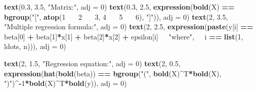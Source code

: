 \documentclass[
  11pt,
]{krantz}
\newenvironment{Shaded}{\begin{snugshade}}{\end{snugshade}}
\newcommand{\DataTypeTok}[1]{\textcolor[rgb]{0.27,0.27,0.27}{#1}}
\newcommand{\DecValTok}[1]{\textcolor[rgb]{0.06,0.06,0.06}{#1}}
\newcommand{\ErrorTok}[1]{\textcolor[rgb]{0.14,0.14,0.14}{\textbf{#1}}}
\newcommand{\FloatTok}[1]{\textcolor[rgb]{0.06,0.06,0.06}{#1}}
\newcommand{\KeywordTok}[1]{\textcolor[rgb]{0.27,0.27,0.27}{\textbf{#1}}}
\newcommand{\NormalTok}[1]{#1}
\newcommand{\OperatorTok}[1]{\textcolor[rgb]{0.43,0.43,0.43}{\textbf{#1}}}
\newcommand{\StringTok}[1]{\textcolor[rgb]{0.5,0.5,0.5}{#1}}
\begin{document}
\begin{tiny}
\begin{Shaded}
\begin{Highlighting}[]
\KeywordTok{text}\NormalTok{(}\FloatTok{0.3}\NormalTok{, }\FloatTok{3.5}\NormalTok{, }\StringTok{"Matrix:"}\NormalTok{, }\DataTypeTok{adj =} \DecValTok{0}\NormalTok{)}
\KeywordTok{text}\NormalTok{(}\FloatTok{0.3}\NormalTok{, }\FloatTok{2.5}\NormalTok{,}
     \KeywordTok{expression}\NormalTok{(}\KeywordTok{bold}\NormalTok{(X) }\OperatorTok{==}\StringTok{ }\KeywordTok{bgroup}\NormalTok{(}\StringTok{"["}\NormalTok{, }\KeywordTok{atop}\NormalTok{(}\DecValTok{1} \OperatorTok{~}\ErrorTok{~}\StringTok{ }\DecValTok{2} \OperatorTok{~}\ErrorTok{~}\StringTok{ }\DecValTok{3}\NormalTok{, }
                                            \DecValTok{4} \OperatorTok{~}\ErrorTok{~}\StringTok{ }\DecValTok{5} \OperatorTok{~}\ErrorTok{~}\StringTok{ }\DecValTok{6}\NormalTok{), }\StringTok{"]"}\NormalTok{)),}
     \DataTypeTok{adj =} \DecValTok{0}\NormalTok{)}
\KeywordTok{text}\NormalTok{(}\DecValTok{2}\NormalTok{, }\FloatTok{3.5}\NormalTok{, }\StringTok{"Multiple regression formula:"}\NormalTok{,}
     \DataTypeTok{adj =} \DecValTok{0}\NormalTok{)}
\KeywordTok{text}\NormalTok{(}\DecValTok{2}\NormalTok{, }\FloatTok{2.5}\NormalTok{,}
     \KeywordTok{expression}\NormalTok{(}\KeywordTok{paste}\NormalTok{(y[i] }\OperatorTok{==}\StringTok{ }\NormalTok{beta[}\DecValTok{0}\NormalTok{] }\OperatorTok{+}\StringTok{ }\NormalTok{beta[}\DecValTok{1}\NormalTok{]}\OperatorTok{*}\NormalTok{x[}\DecValTok{1}\NormalTok{] }\OperatorTok{+}\StringTok{ }
\StringTok{                        }\NormalTok{beta[}\DecValTok{2}\NormalTok{]}\OperatorTok{*}\NormalTok{x[}\DecValTok{2}\NormalTok{] }\OperatorTok{+}\StringTok{ }\NormalTok{epsilon[i]}\OperatorTok{~}\ErrorTok{~}
\StringTok{                      "where"}\NormalTok{, }\OperatorTok{~}\ErrorTok{~}\NormalTok{i }\OperatorTok{==}\StringTok{ }\KeywordTok{list}\NormalTok{(}\DecValTok{1}\NormalTok{, ldots, n))),}
     \DataTypeTok{adj =} \DecValTok{0}\NormalTok{)}

\KeywordTok{text}\NormalTok{(}\DecValTok{2}\NormalTok{, }\FloatTok{1.5}\NormalTok{, }\StringTok{"Regression equation:"}\NormalTok{, }\DataTypeTok{adj =} \DecValTok{0}\NormalTok{)}
\KeywordTok{text}\NormalTok{(}\DecValTok{2}\NormalTok{, }\FloatTok{0.5}\NormalTok{,}
     \KeywordTok{expression}\NormalTok{(}\KeywordTok{hat}\NormalTok{(}\KeywordTok{bold}\NormalTok{(beta)) }\OperatorTok{==}\StringTok{ }\KeywordTok{bgroup}\NormalTok{(}\StringTok{"("}\NormalTok{, }\KeywordTok{bold}\NormalTok{(X)}\OperatorTok{^}\NormalTok{T}\OperatorTok{*}\KeywordTok{bold}\NormalTok{(X), }
                                          \StringTok{")"}\NormalTok{)}\OperatorTok{^-}\DecValTok{1}\OperatorTok{*}\KeywordTok{bold}\NormalTok{(X)}\OperatorTok{^}\NormalTok{T}\OperatorTok{*}\KeywordTok{bold}\NormalTok{(y)),}
     \DataTypeTok{adj =} \DecValTok{0}\NormalTok{)}
\end{Highlighting}
\end{Shaded}

\normalsize

\end{tiny}
\end{document}
